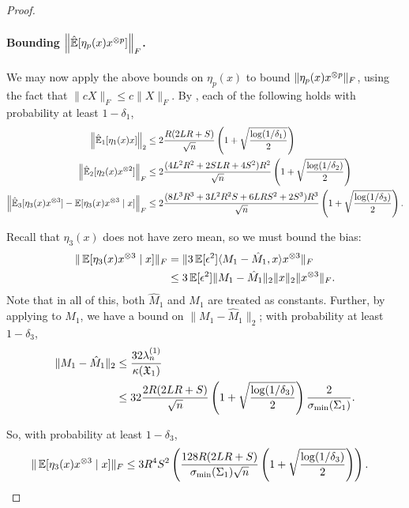 \begin{proof}
\paragraph{Bounding $\left\| \hat{\operatorname{\mathbb{E}}}[\eta_p(x)x^{\otimes p}] \right\|_F$.}
We may now apply the above bounds on $\eta_p(x)$ to bound $\|\eta_p(x) x^{\otimes p}\|_F$, using the fact that $\|c X\|_F \le c\|X\|_F$.
By , each of the following holds with probability at least $1-\delta_1$,
\begin{align*}
    \left\|\hat{\operatorname{\mathbb{E}}}_1[\eta_1(x) x] \right\|_2
    &\le 2 \frac{R (2LR + S)}{\sqrt{n}} \left( 1 + \sqrt{\frac{\log(1/\delta_1)}{2}} \right) \\
  \left\|\hat{\operatorname{\mathbb{E}}}_2[\eta_2(x) x^{\otimes 2}] \right\|_F
      &\le 2 \frac{(4L^2 R^2 + 2 S L R + 4S^2)R^2}{\sqrt{n}} \left( 1 + \sqrt{\frac{\log(1/\delta_2)}{2}} \right) \\
  \left\|\hat{\operatorname{\mathbb{E}}}_3[\eta_3(x) x^{\otimes 3}] - \operatorname{\mathbb{E}}[\eta_3(x) x^{\otimes 3} \mid x] \right\|_F
      &\le 2 \frac{(8L^3 R^3 + 3 L^2 R^2 S + 6 L R S^2 + 2S^3) R^3}{\sqrt{n}} \left( 1 + \sqrt{\frac{\log(1/\delta_3)}{2}} \right).
\end{align*}

Recall that $\eta_3(x)$ does not have zero mean, so we must bound the bias:
\begin{align*}
  \| \operatorname{\mathbb{E}}[\eta_3(x) x^{\otimes 3} \mid x] \|_F &= \|3 \operatorname{\mathbb{E}}[\epsilon^2] \langle M_1 - \hat M_1, x \rangle x^{\otimes 3} \|_F \\
    &\le 3 \operatorname{\mathbb{E}}[\epsilon^2] \|M_1 - \hat M_1\|_2 \|x\|_2 \|x^{\otimes 3}\|_F.
\end{align*}
Note that in all of this, both $\hat M_1$ and $M_1$ are treated as
constants. 
Further, by applying  to $M_1$, we have a bound on $\|M_1 - \hat
M_1\|_2$; with probability at least $1-\delta_3$,
\begin{align*}
  \| M_1 - \hat M_1 \|_2
  &\le \frac{32 \lambda^{(1)}_n}{\kappa(\operatorname{\mathfrak{X}}_1)} \\
  &\le 32 \frac{2R(2LR+S)}{\sqrt{n}}\left(1 + \sqrt{\frac{\log(1/\delta_3)}{2}}\right) \frac{2}{\sigma_\text{\rm min}(\Sigma_1)}.
\end{align*}

So, with probability at least $1 - \delta_3$,
\begin{align*}
  \| \operatorname{\mathbb{E}}[\eta_3(x) x^{\otimes 3} \mid x] \|_F
  &\le 3 R^4 S^2 \left(\frac{128 R(2LR+S)}{\sigma_\text{\rm min}(\Sigma_1) \sqrt{n}} \left(1 + \sqrt{\frac{\log(1/\delta_3)}{2}} \right) \right).
\end{align*}


\end{proof}
